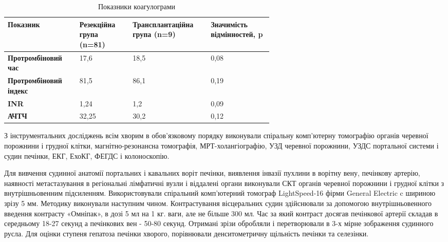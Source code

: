 \begin{table}[]
\centering
\caption{Показники коагулограми }
\label{tab:KG}
\begin{tabular}{|p{0.15\linewidth}|
                 p{0.15\linewidth}|
                 p{0.15\linewidth}|
                 p{0.15\linewidth}|}
\hline
{\color[HTML]{231F20} \textbf{Показник}} &
  {\color[HTML]{231F20} \textbf{Резекційна група (n=81)}} &
  {\color[HTML]{231F20} \textbf{Транс\-план\-тацій\-на група (n=9)}} &
  {\color[HTML]{231F20} \textbf{Значимість відмінностей, p}} \\ \hline
{\color[HTML]{231F20} \textbf{Про\-тромб\-іновий час}}    & {\color[HTML]{231F20} 17,6}  & {\color[HTML]{231F20} 18,5} & 0,08 \\ \hline
{\color[HTML]{231F20} \textbf{Про\-тромб\-іновий індекс}} & {\color[HTML]{231F20} 81,5}  & {\color[HTML]{231F20} 86,1} & 0,19 \\ \hline
{\color[HTML]{231F20} \textbf{INR}}                   & {\color[HTML]{231F20} 1,24}  & {\color[HTML]{231F20} 1,2}  & 0,09 \\ \hline
{\color[HTML]{231F20} \textbf{АЧТЧ}}                  & {\color[HTML]{231F20} 32,25} & {\color[HTML]{231F20} 30,2} & 0,12 \\ \hline
\end{tabular}
\end{table}




З інструментальних досліджень всім хворим в обов'язковому порядку виконували спіральну комп'ютерну томографію органів черевної порожнини і грудної клітки, магнітно-резонансна томографія, МРТ-холангіографію, УЗД черевної порожнини, УЗДС портальної системи і судин печінки, ЕКГ, ЕхоКГ, ФЕГДС і колоноскопію. 

Для вивчення судинної анатомії портальних і кавальних воріт печінки, виявлення інвазії пухлини в ворітну вену, печінкову артерію, наявності метастазування в регіональні лімфатичні вузли і віддалені органи виконували СКТ органів черевної порожнини і грудної клітки з внутрішньовенним підсиленням. Використовували спіральний комп'ютерний томограф LightSpeed-16 фірми General Electric c шириною зрізу 5 мм. Методику виконували наступним чином. Контрастування вісцеральних судин здійснювали за допомогою внутрішньовенного введення контрасту «Омніпак», в дозі 5 мл на 1 кг. ваги, але не більше 300 мл. Час за який контраст досягав печінкової артерії складав в середньому 18-27 секунд а печінкових вен - 50-80 секунд. Отримані зрізи обробляли і перетворювали в 3-х мірне зображення судинного русла. Для оцінки ступеня гепатоза печінки хворого, порівнювали денситометричну щільність печінки та селезінки.

